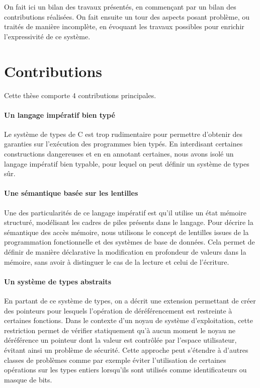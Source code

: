 On fait ici un bilan des travaux présentés, en commençant par un bilan des
contributions réalisées. On fait ensuite un tour des aspects posant problème, ou
traités de manière incomplète, en évoquant les travaux possibles pour enrichir
l'expressivité de ce système.


\section{Contributions}

Cette thèse comporte 4 contributions principales.

\paragraph{Un langage impératif bien typé}

Le système de types de C est trop rudimentaire pour permettre d'obtenir des
garanties sur l'exécution des programmes bien typés. En interdisant certaines
constructions dangereuses et en en annotant certaines, nous avons isolé un
langage impératif bien typable, pour lequel on peut définir un système de types
sûr.

\paragraph{Une sémantique basée sur les lentilles}

Une des particularités de ce langage impératif est qu'il utilise un état mémoire
structuré, modélisant les cadres de piles présents dans le langage. Pour décrire
la sémantique des accès mémoire, nous utilisons le concept de lentilles issues
de la programmation fonctionnelle et des systèmes de base de données. Cela
permet de définir de manière déclarative la modification en profondeur de
valeurs dans la mémoire, sans avoir à distinguer le cas de la lecture et celui
de l'écriture.

\paragraph{Un système de types abstraits}

En partant de ce système de types, on a décrit une extension permettant de créer
des pointeurs pour lesquels l'opération de déréférencement est restreinte à
certaines fonctions. Dans le contexte d'un noyau de système d'exploitation,
cette restriction permet de vérifier statiquement qu'à aucun moment le noyau ne
déréférence un pointeur dont la valeur est contrôlée par l'espace utilisateur,
évitant ainsi un problème de sécurité. Cette approche peut s'étendre à d'autres
classes de problèmes comme par exemple éviter l'utilisation de certaines
opérations sur les types entiers lorsqu'ils sont utilisés comme identificateurs
ou masque de bits.

